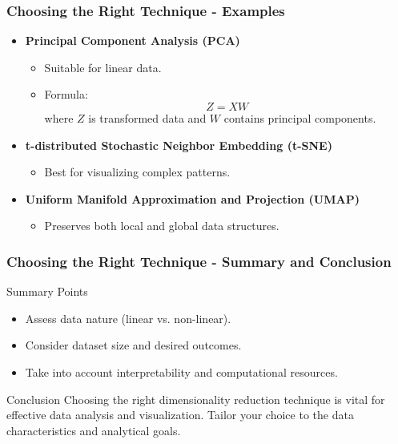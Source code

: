 \documentclass[aspectratio=169]{beamer}
\begin{document}
\begin{frame}[fragile]
    \frametitle{Choosing the Right Technique - Examples}
    \begin{itemize}
        \item \textbf{Principal Component Analysis (PCA)}
            \begin{itemize}
                \item Suitable for linear data.
                \item Formula: 
                    \[
                    Z = XW
                    \]
                    where \( Z \) is transformed data and \( W \) contains principal components.
            \end{itemize}
        \item \textbf{t-distributed Stochastic Neighbor Embedding (t-SNE)}
            \begin{itemize}
                \item Best for visualizing complex patterns.
            \end{itemize}
        \item \textbf{Uniform Manifold Approximation and Projection (UMAP)}
            \begin{itemize}
                \item Preserves both local and global data structures.
            \end{itemize}
    \end{itemize}
\end{frame}

\begin{frame}[fragile]
    \frametitle{Choosing the Right Technique - Summary and Conclusion}
    \begin{block}{Summary Points}
        \begin{itemize}
            \item Assess data nature (linear vs. non-linear).
            \item Consider dataset size and desired outcomes.
            \item Take into account interpretability and computational resources.
        \end{itemize}
    \end{block}
    \begin{block}{Conclusion}
        Choosing the right dimensionality reduction technique is vital for effective data analysis and visualization. Tailor your choice to the data characteristics and analytical goals.
    \end{block}
\end{frame}
\end{document}
